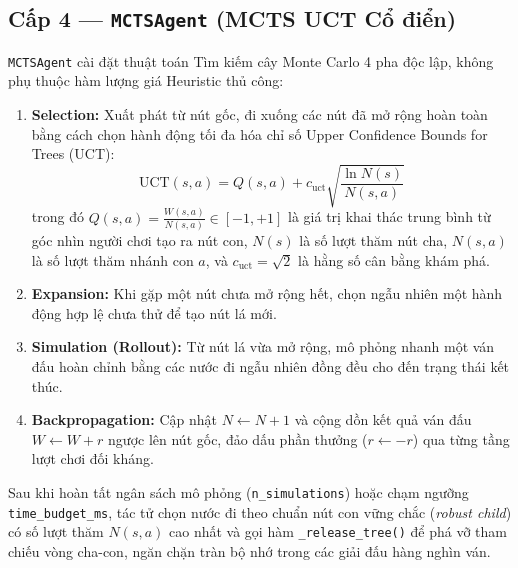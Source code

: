 \documentclass[a4paper,12pt]{report}
\begin{document}
\subsection{Cấp 4 --- \texttt{MCTSAgent} (MCTS UCT Cổ điển)}
\texttt{MCTSAgent} cài đặt thuật toán Tìm kiếm cây Monte Carlo 4 pha độc lập, không phụ thuộc hàm lượng giá Heuristic thủ công:
\begin{enumerate}[leftmargin=1.2cm]
    \item \textbf{Selection:} Xuất phát từ nút gốc, đi xuống các nút đã mở rộng hoàn toàn bằng cách chọn hành động tối đa hóa chỉ số Upper Confidence Bounds for Trees (UCT):
    \begin{equation}
        \text{UCT}(s, a) = Q(s, a) + c_{\text{uct}} \sqrt{\frac{\ln N(s)}{N(s, a)}}
    \end{equation}
    trong đó $Q(s, a) = \frac{W(s, a)}{N(s, a)} \in [-1, +1]$ là giá trị khai thác trung bình từ góc nhìn người chơi tạo ra nút con, $N(s)$ là số lượt thăm nút cha, $N(s, a)$ là số lượt thăm nhánh con $a$, và $c_{\text{uct}} = \sqrt{2}$ là hằng số cân bằng khám phá.
    \item \textbf{Expansion:} Khi gặp một nút chưa mở rộng hết, chọn ngẫu nhiên một hành động hợp lệ chưa thử để tạo nút lá mới.
    \item \textbf{Simulation (Rollout):} Từ nút lá vừa mở rộng, mô phỏng nhanh một ván đấu hoàn chỉnh bằng các nước đi ngẫu nhiên đồng đều cho đến trạng thái kết thúc.
    \item \textbf{Backpropagation:} Cập nhật $N \leftarrow N + 1$ và cộng dồn kết quả ván đấu $W \leftarrow W + r$ ngược lên nút gốc, đảo dấu phần thưởng ($r \leftarrow -r$) qua từng tầng lượt chơi đối kháng.
\end{enumerate}

Sau khi hoàn tất ngân sách mô phỏng (\texttt{n\_\allowbreak simulations}) hoặc chạm ngưỡng \texttt{time\_\allowbreak budget\_\allowbreak ms}, tác tử chọn nước đi theo chuẩn nút con vững chắc (\textit{robust child}) có số lượt thăm $N(s, a)$ cao nhất và gọi hàm \texttt{\_release\_\allowbreak tree()} để phá vỡ tham chiếu vòng cha-con, ngăn chặn tràn bộ nhớ trong các giải đấu hàng nghìn ván.
\end{document}
